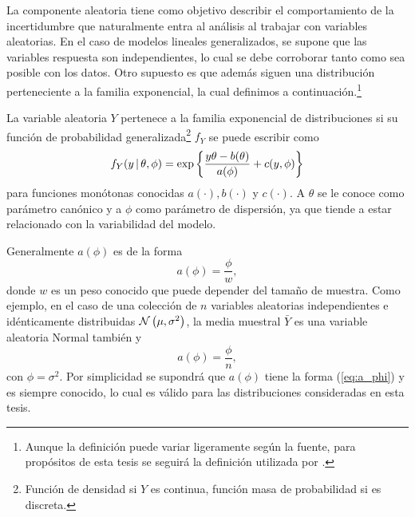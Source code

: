 La componente aleatoria tiene como objetivo describir el comportamiento de la incertidumbre que naturalmente entra al análisis al trabajar con variables aleatorias. En el caso de modelos lineales generalizados, se supone que las variables respuesta son independientes, lo cual se debe corroborar tanto como sea posible con los datos. Otro supuesto es que además siguen una distribución perteneciente a la familia exponencial, la cual definimos a continuación.\footnote{Aunque la definición puede variar ligeramente según la fuente, para propósitos de esta tesis se seguirá la definición utilizada por \cite[Capítulo 2.2.2]{nelder_glm}.}

\begin{definition} \label{def:fam_exponencial}
La variable aleatoria $Y$ pertenece a la familia exponencial de distribuciones si su función de probabilidad generalizada\footnote{Función de densidad si $Y$ es continua, función masa de probabilidad si es discreta.} $f_Y$ se puede escribir como
\begin{equation*}
f_Y(y \, | \, \theta, \phi) = \mathrm{exp} \left\{ \frac{y\theta - b(\theta)}{a(\phi)} + c(y, \phi) \right\} 
\end{equation*}
para funciones monótonas conocidas $a(\cdot), b(\cdot)$ y $c(\cdot)$. A $\theta$ se le conoce como parámetro canónico y a $\phi$ como parámetro de dispersión, ya que tiende a estar relacionado con la variabilidad del modelo.
\end{definition}

Generalmente $a(\phi)$ es de la forma
\begin{equation} \label{eq:a_phi}
	a(\phi) = \frac{ \phi }{ w },
\end{equation}
donde $w$ es un peso conocido que puede depender del tamaño de muestra. Como ejemplo, en el caso de una colección de $n$ variables aleatorias independientes e idénticamente distribuidas $\mathcal{N} \left( \mu, \sigma^2 \right)$, la media muestral $\bar{Y}$ es una variable aleatoria Normal también y
\begin{equation*}
	a(\phi) = \frac{\phi}{n},
\end{equation*}
con $\phi = \sigma^2$. Por simplicidad se supondrá que $a(\phi)$ tiene la forma (\ref{eq:a_phi}) y es siempre conocido, lo cual es válido para las distribuciones consideradas en esta tesis. \\


